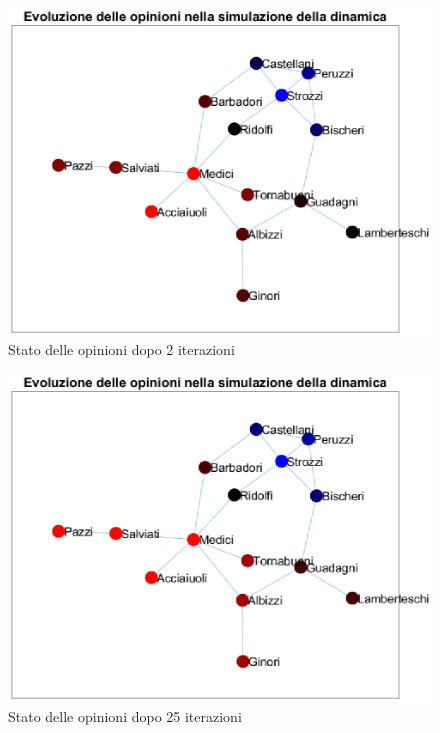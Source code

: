 \documentclass[11pt,largemargins]{homework}
\begin{document}
\begin{alphaparts}
  \begin{figure}[htb]
    \center
     \includegraphics[scale=0.6]{Grafo_2_iterazioni.eps}
    \caption{Stato delle opinioni dopo 2 iterazioni}
  \end{figure}
  \begin{figure}
    \center
    \includegraphics[scale=0.6]{Grafo_25_iter.eps}
    \caption{Stato delle opinioni dopo 25 iterazioni}
  \end{figure}
  \begin{figure}
    \center

\end{figure}
\end{alphaparts}
\end{document}

